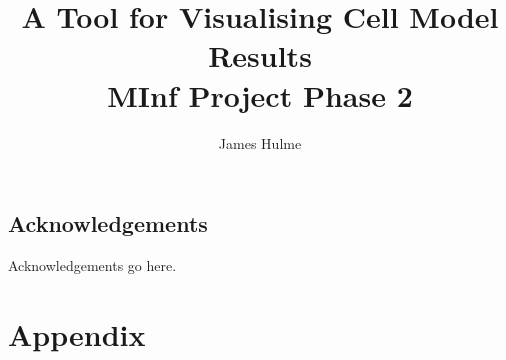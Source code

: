 \documentclass[bsc, frontabs, twoside, singlespacing, parskip]{infthesis}
\begin{document}
\title{A Tool for Visualising Cell Model Results \\
       MInf Project Phase 2}
\author{James Hulme}

\maketitle

\section*{Acknowledgements}
Acknowledgements go here.

\thispagestyle{empty}

\newpage


\thispagestyle{empty}

\newpage

\tableofcontents
\thispagestyle{empty}

\clearpage
\setcounter{page}{1}





%


\clearpage
\chapter{Appendix}





\end{document}
